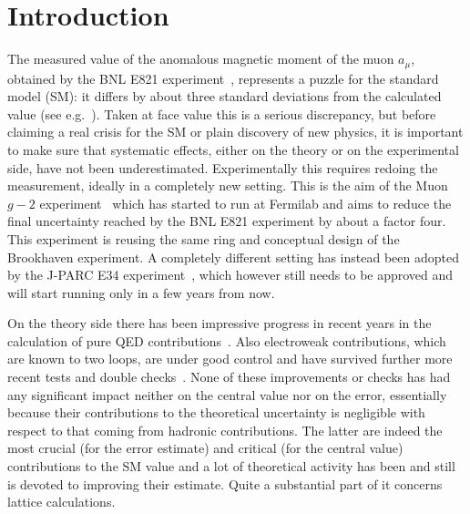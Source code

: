 \documentclass[epj]{webofc}
\newcommand{\<}{\langle}
\renewcommand{\>}{\rangle}
\begin{document}
\section{Introduction}\label{intro}
The measured value of the anomalous magnetic moment of the muon $a_\mu$,
obtained by the BNL E821 experiment~\cite{Bennett:2006fi}, represents a
puzzle for the standard model (SM): it differs by about three standard
deviations from the calculated value (see
e.g.~\cite{Hagiwara:2017zod,Davier:2016iru}). Taken at face value this is a
serious discrepancy, but before claiming a 
real crisis for the SM or plain discovery of new physics, it is important
to make sure that systematic effects, either on the theory or on the
experimental side, have not been underestimated. Experimentally this
requires redoing the measurement, ideally in a completely new setting. This
is the aim of the Muon $g-2$ experiment~\cite{Grange:2015fou} which has
started to run at Fermilab and aims to reduce the final uncertainty reached
by the BNL E821 experiment by about a factor four. This experiment is reusing
the same ring and conceptual design of the Brookhaven experiment. A
completely different setting has instead been adopted by the J-PARC E34
experiment~\cite{Saito:2012zz}, which however still needs to be approved
and will start running only in a few years from now.

On the theory side there has been impressive progress in recent years in
the calculation of pure QED
contributions~\cite{Aoyama:2012fc,Aoyama:2012wk,Aoyama:2014sxa,Laporta:2017okg}. Also
electroweak contributions, which are known to two loops, are under good
control and have survived further more recent tests and double
checks~\cite{Gnendiger:2013pva,Ishikawa:2017ouv}. None of these
improvements or checks has had any significant impact neither on the
central value nor on the error, essentially because their contributions to
the theoretical uncertainty is negligible with respect to that coming from
hadronic contributions. The latter are indeed the most crucial (for the
error estimate) and critical (for the central value) contributions to the
SM value and a lot of theoretical activity has been and still is devoted to
improving their estimate. Quite a substantial part of it concerns lattice
calculations. 
\end{document}
